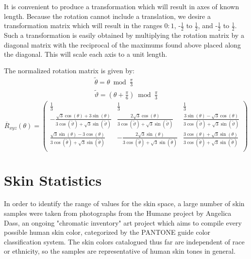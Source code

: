 It is convenient to produce a transformation which will result in axes of known length. Because the rotation cannot include a translation, we desire a transformation matrix which will result in the ranges $0:1$, -$\frac{1}2$ to $\frac{1}2$, and -$\frac{1}2$ to $\frac{1}2$. Such a transformation is easily obtained by multiplying the rotation matrix by a diagonal matrix with the reciprocal of the maximums found above placed along the diagonal. This will scale each axis to a unit length.

The normalized rotation matrix is given by:
\begin{gather*}
  \widetilde{\theta} = \theta  \bmod \frac{\pi }{3} \\
\widetilde{\vartheta} = \left(\theta +\frac{\pi }{6}\right) \bmod \frac{\pi }{3}
\end{gather*}
\begin{equation}\label{eq:NormRxyz}
\overline{R}_{xyz}(\theta) =
\left(
\begin{array}{ccc}
 \frac{1}{3} & \frac{1}{3} & \frac{1}{3} \\
 -\frac{\sqrt{3} \cos (\theta )+3 \sin (\theta )}{3 \cos \left(\widetilde{\vartheta}\right)+\sqrt{3} \sin \left(\widetilde{\vartheta}\right)} & \frac{2 \sqrt{3} \cos (\theta )}{3 \cos \left(\widetilde{\vartheta}\right)+\sqrt{3} \sin \left(\widetilde{\vartheta}\right)} & \frac{3 \sin (\theta )-\sqrt{3} \cos (\theta )}{3 \cos \left(\widetilde{\vartheta}\right)+\sqrt{3} \sin \left(\widetilde{\vartheta}\right)} \\
 \frac{\sqrt{3} \sin (\theta )-3 \cos (\theta )}{3 \cos \left(\widetilde{\theta}\right)+\sqrt{3} \sin \left(\widetilde{\theta}\right)} & -\frac{2 \sqrt{3} \sin (\theta )}{3 \cos \left(\widetilde{\theta}\right)+\sqrt{3} \sin \left(\widetilde{\theta}\right)} & \frac{3 \cos (\theta )+\sqrt{3} \sin (\theta )}{3 \cos \left(\widetilde{\theta}\right)+\sqrt{3} \sin \left(\widetilde{\theta}\right)} \\
\end{array}
\right)
\end{equation}

\section{Skin Statistics}\label{sec:SkinStatistics}

In order to identify the range of values for the skin space, a large number of skin samples were taken from photographs from the Humane project by Angelica Dass, an ongoing "chromatic inventory" art project which aims to compile every possible human skin color, categorized by the PANTONE guide color classification system. The skin colors catalogued thus far are independent of race or ethnicity, so the samples are representative of human skin tones in general.


